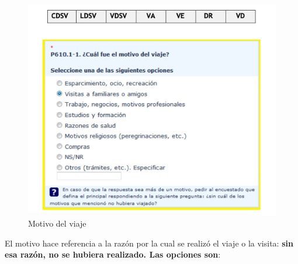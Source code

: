 \documentclass[
  openany]{book}
\begin{document}
\begin{figure}

{\centering \includegraphics[width=1\linewidth]{imagenes/figura6-100} 

}

\caption{Motivo del viaje}\label{fig:motiv987}
\end{figure}

El motivo hace referencia a la razón por la cual se realizó el viaje o la visita: \textbf{sin esa razón, no se hubiera realizado. Las opciones son}:
\end{document}
